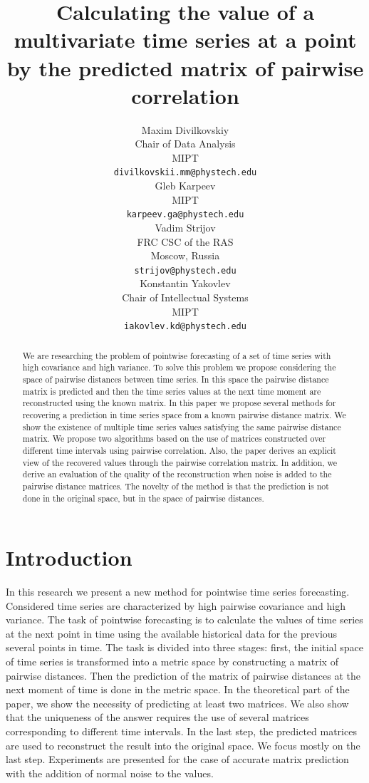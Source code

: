 \documentclass{article}
\title{Calculating the value of a multivariate time series at a point by the predicted matrix of pairwise correlation}
\author{ Maxim Divilkovskiy \\
	Chair of Data Analysis\\
	MIPT\\
	\texttt{divilkovskii.mm@phystech.edu} \\
	\And Gleb Karpeev \\
	MIPT\\
	\texttt{karpeev.ga@phystech.edu} \\
	\And
	Vadim Strijov \\
	FRC CSC of the RAS\\
	Moscow, Russia\\
    \texttt{strijov@phystech.edu} \\
    \And
    Konstantin Yakovlev \\
    Chair of Intellectual Systems\\
    MIPT\\
    \texttt{iakovlev.kd@phystech.edu} \\
}
\date{}
\begin{document}
\maketitle

\begin{abstract}
	We are researching the problem of pointwise forecasting of a set of time series with high covariance and high variance. To solve this problem we propose considering the space of pairwise distances between time series. In this space the pairwise distance matrix is predicted and then the time series values at the next time moment are reconstructed using the known matrix. In this paper we propose several methods for recovering a prediction in time series space from a known pairwise distance matrix. We show the existence of multiple time series values satisfying the same pairwise distance matrix. We propose two algorithms based on the use of matrices constructed over different time intervals using pairwise correlation. Also, the paper derives an explicit view of the recovered values through the pairwise correlation matrix. In addition, we derive an evaluation of the quality of the reconstruction when noise is added to the pairwise distance matrices. The novelty of the method is that the prediction is not done in the original space, but in the space of pairwise distances.


\end{abstract}



\section{Introduction}
 	In this research we present a new method for pointwise time series forecasting. Considered time series are characterized by high pairwise covariance and high variance. The task of pointwise forecasting is to calculate the values of time series at the next point in time using the available historical data for the previous several points in time. The task is divided into three stages: first, the initial space of time series is transformed into a metric space by constructing a matrix of pairwise distances. Then the prediction of the matrix of pairwise distances at the next moment of time is done in the metric space. In the theoretical part of the paper, we show the necessity of predicting at least two matrices. We also show that the uniqueness of the answer requires the use of several matrices corresponding to different time intervals. In the last step, the predicted matrices are used to reconstruct the result into the original space. We focus mostly on the last step. Experiments are presented for the case of accurate matrix prediction with the addition of normal noise to the values.
\end{document}
